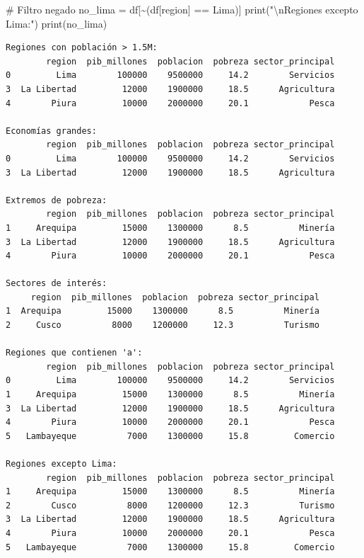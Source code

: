\documentclass[
  doc,
  floatsintext,
  longtable,
  a4paper,
  nolmodern,
  notxfonts,
  notimes,
  12pt,
  colorlinks=true,linkcolor=blue,citecolor=blue,urlcolor=blue]{apa7}
\newenvironment{Shaded}{\begin{snugshade}}{\end{snugshade}}
\newcommand{\BuiltInTok}[1]{\textcolor[rgb]{0.00,0.23,0.31}{#1}}
\newcommand{\CharTok}[1]{\textcolor[rgb]{0.13,0.47,0.30}{#1}}
\newcommand{\CommentTok}[1]{\textcolor[rgb]{0.37,0.37,0.37}{#1}}
\newcommand{\NormalTok}[1]{\textcolor[rgb]{0.00,0.23,0.31}{#1}}
\newcommand{\OperatorTok}[1]{\textcolor[rgb]{0.37,0.37,0.37}{#1}}
\newcommand{\StringTok}[1]{\textcolor[rgb]{0.13,0.47,0.30}{#1}}
\begin{document}
\begin{Shaded}
\begin{Highlighting}[]
\CommentTok{\# Filtro negado}
\NormalTok{no\_lima }\OperatorTok{=}\NormalTok{ df[}\OperatorTok{\textasciitilde{}}\NormalTok{(df[}\StringTok{\textquotesingle{}region\textquotesingle{}}\NormalTok{] }\OperatorTok{==} \StringTok{\textquotesingle{}Lima\textquotesingle{}}\NormalTok{)]}
\BuiltInTok{print}\NormalTok{(}\StringTok{"}\CharTok{\textbackslash{}n}\StringTok{Regiones excepto Lima:"}\NormalTok{)}
\BuiltInTok{print}\NormalTok{(no\_lima)}
\end{Highlighting}
\end{Shaded}

\begin{verbatim}
Regiones con población > 1.5M:
        region  pib_millones  poblacion  pobreza sector_principal
0         Lima        100000    9500000     14.2        Servicios
3  La Libertad         12000    1900000     18.5      Agricultura
4        Piura         10000    2000000     20.1            Pesca

Economías grandes:
        region  pib_millones  poblacion  pobreza sector_principal
0         Lima        100000    9500000     14.2        Servicios
3  La Libertad         12000    1900000     18.5      Agricultura

Extremos de pobreza:
        region  pib_millones  poblacion  pobreza sector_principal
1     Arequipa         15000    1300000      8.5          Minería
3  La Libertad         12000    1900000     18.5      Agricultura
4        Piura         10000    2000000     20.1            Pesca

Sectores de interés:
     region  pib_millones  poblacion  pobreza sector_principal
1  Arequipa         15000    1300000      8.5          Minería
2     Cusco          8000    1200000     12.3          Turismo

Regiones que contienen 'a':
        region  pib_millones  poblacion  pobreza sector_principal
0         Lima        100000    9500000     14.2        Servicios
1     Arequipa         15000    1300000      8.5          Minería
3  La Libertad         12000    1900000     18.5      Agricultura
4        Piura         10000    2000000     20.1            Pesca
5   Lambayeque          7000    1300000     15.8         Comercio

Regiones excepto Lima:
        region  pib_millones  poblacion  pobreza sector_principal
1     Arequipa         15000    1300000      8.5          Minería
2        Cusco          8000    1200000     12.3          Turismo
3  La Libertad         12000    1900000     18.5      Agricultura
4        Piura         10000    2000000     20.1            Pesca
5   Lambayeque          7000    1300000     15.8         Comercio
\end{verbatim}
\end{document}
